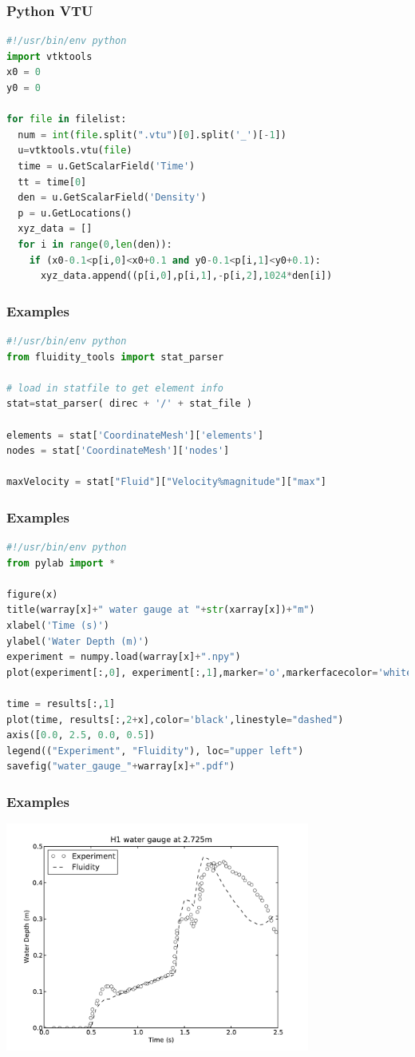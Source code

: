 \documentclass[12pt]{beamer}
\begin{document}
\begin{frame}[fragile]
	\frametitle{Python VTU}
\begin{lstlisting}[language=python]
#!/usr/bin/env python
import vtktools
x0 = 0
y0 = 0

for file in filelist:
  num = int(file.split(".vtu")[0].split('_')[-1])
  u=vtktools.vtu(file)
  time = u.GetScalarField('Time')
  tt = time[0]
  den = u.GetScalarField('Density')
  p = u.GetLocations()
  xyz_data = []
  for i in range(0,len(den)):
    if (x0-0.1<p[i,0]<x0+0.1 and y0-0.1<p[i,1]<y0+0.1):
      xyz_data.append((p[i,0],p[i,1],-p[i,2],1024*den[i])
\end{lstlisting}
\end{frame}
\begin{frame}[fragile]
	\frametitle{Examples}
\begin{lstlisting}[language=python]
#!/usr/bin/env python
from fluidity_tools import stat_parser

# load in statfile to get element info
stat=stat_parser( direc + '/' + stat_file )

elements = stat['CoordinateMesh']['elements']
nodes = stat['CoordinateMesh']['nodes']

maxVelocity = stat["Fluid"]["Velocity%magnitude"]["max"]
\end{lstlisting}
\end{frame}


\begin{frame}[fragile]
	\frametitle{Examples}
\begin{lstlisting}[language=python]
#!/usr/bin/env python
from pylab import *

figure(x)
title(warray[x]+" water gauge at "+str(xarray[x])+"m")
xlabel('Time (s)')
ylabel('Water Depth (m)')
experiment = numpy.load(warray[x]+".npy")
plot(experiment[:,0], experiment[:,1],marker='o',markerfacecolor='white',markersize=6, markeredgecolor='black',linestyle="None")

time = results[:,1]
plot(time, results[:,2+x],color='black',linestyle="dashed")
axis([0.0, 2.5, 0.0, 0.5])
legend(("Experiment", "Fluidity"), loc="upper left")
savefig("water_gauge_"+warray[x]+".pdf")

\end{lstlisting}
\end{frame}

\begin{frame}
	\frametitle{Examples}
\includegraphics[width=0.75\textwidth]{images/water_gauge_H1.pdf}
\end{frame}
\end{document}
